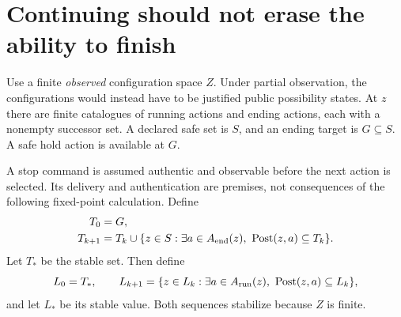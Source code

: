 \section{Continuing should not erase the ability to finish}
Use a finite \emph{observed} configuration space $Z$. Under partial observation, the configurations would instead have to be justified public possibility states. At $z$ there are finite catalogues of running actions and ending actions, each with a nonempty successor set. A declared safe set is $S$, and an ending target is $G\subseteq S$. A safe hold action is available at $G$.

A stop command is assumed authentic and observable before the next action is selected. Its delivery and authentication are premises, not consequences of the following fixed-point calculation. Define
\begin{align*}
T_0&=G,\\
T_{k+1}&=T_k\cup\{z\in S:\exists a\in A_{\rm end}(z),\ \operatorname{Post}(z,a)\subseteq T_k\}.
\end{align*}
Let $T_*$ be the stable set. Then define
\[
L_0=T_*,\qquad
L_{k+1}=\{z\in L_k:\exists a\in A_{\rm run}(z),\ \operatorname{Post}(z,a)\subseteq L_k\},
\]
and let $L_*$ be its stable value. Both sequences stabilize because $Z$ is finite.


